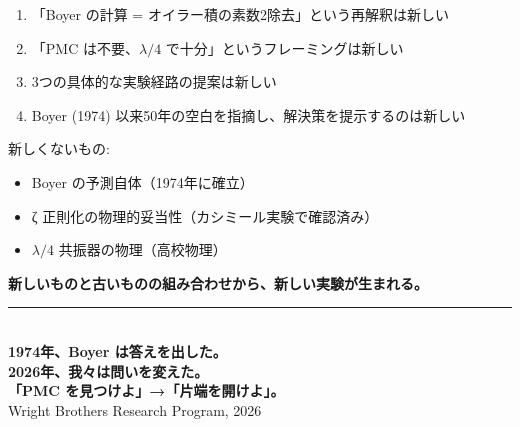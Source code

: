 \documentclass[12pt,a4paper]{article}
\begin{document}
\begin{honestbox}[この論文の独自性]
\begin{enumerate}
\item 「Boyer の計算 = オイラー積の素数2除去」という再解釈は新しい
\item 「PMC は不要、$\lambda/4$ で十分」というフレーミングは新しい
\item 3つの具体的な実験経路の提案は新しい
\item Boyer (1974) 以来50年の空白を指摘し、解決策を提示するのは新しい
\end{enumerate}

新しくないもの:
\begin{itemize}
\item Boyer の予測自体（1974年に確立）
\item ζ 正則化の物理的妥当性（カシミール実験で確認済み）
\item $\lambda/4$ 共振器の物理（高校物理）
\end{itemize}

\textbf{新しいものと古いものの組み合わせから、新しい実験が生まれる。}
\end{honestbox}

\vfill

\begin{center}
\rule{10cm}{0.4pt}\\[0.5cm]
{\Large\bfseries 1974年、Boyer は答えを出した。}\\[0.2cm]
{\Large\bfseries 2026年、我々は問いを変えた。}\\[0.2cm]
{\Large\bfseries 「PMC を見つけよ」→「片端を開けよ」。}\\[0.3cm]
{\small Wright Brothers Research Program, 2026}
\end{center}
\end{document}
